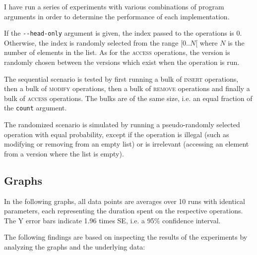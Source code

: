I have run a series of experiments with various combinations of program
arguments in order to determine the performance of each implementation.

If the \texttt{-\@{}-head-only} argument is given, the index passed to
the operations is 0. Otherwise, the index is randomly selected from the range
$[0..N[$ where $N$ is the number of elements in the list. As for the
\textsc{access} operations, the version is randomly chosen between the versions
which exist when the operation is run.

The sequential scenario is tested by first running a bulk of \textsc{insert}
operations, then a bulk of \textsc{modify} operations, then a bulk of
\textsc{remove} operations and finally a bulk of \textsc{access} operations. The
bulks are of the same size, i.e. an equal fraction of the \texttt{count}
argument.

The randomized scenario is simulated by running a pseudo-randomly selected
operation with equal probability, except if the operation is illegal (such as
modifying or removing from an empty list) or is irrelevant (accessing an element
from a version where the list is empty).

\subsection{Graphs}

In the following graphs, all data points are averages over 10 runs with
identical parameters, each representing the duration spent on the respective
operations. The Y error bars indicate 1.96 times SE, i.e. a 95\% confidence
interval.

The following findings are based on inspecting the results of the experiments by
analyzing the graphs and the underlying data:

